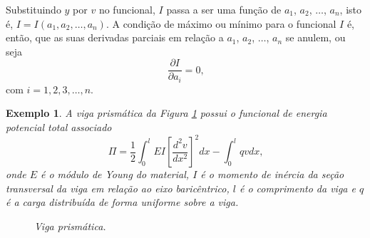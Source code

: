\documentclass[
	12pt,				%
	openright,			%
    twoside,			%
	a4paper,			%
	chapter=TITLE,		%
	english,			%
	french,				%
	spanish,			%
	brazil				%
	]{abntex2}
\newtheorem{exemplo}{Exemplo}
\numberwithin{lema}{chapter}
\numberwithin{teorema}{chapter}
\numberwithin{definicao}{chapter}
\numberwithin{exemplo}{chapter}
\numberwithin{figure}{chapter}
\begin{document}
Substituindo $y$ por $v$ no funcional, $I$ passa a ser uma função de $a_1$, $a_2$, $\dots$, $a_n$, isto é, $I=I(a_1, a_2, \dots, a_n)$. A condição de máximo ou mínimo para o funcional $I$ é, então, que as suas derivadas parciais em relação a $a_1$, $a_2$, $\dots$, $a_n$ se anulem, ou seja
$$
	\frac{\partial I}{\partial a_i} = 0
	\text{,}
$$
com $i=1, 2, 3, \dots, n$.

\begin{exemplo}
	\label{ex:mrr_ex_livro}\cite{mefassan}		
	A viga prismática da Figura \ref{fig:test_02} possui o funcional de energia potencial total associado
	\begin{equation}
		\label{eqn:cap_metodo_ray_ritz:exemplo_func_pi}
		\Pi = 
		\frac{1}{2} \int_0^l EI \left [
			\frac{d^2v}{dx^2}
		\right ]^2 dx
		-
		\int_0^l qvdx
		\text{,}
	\end{equation}
	onde $E$ é o módulo de Young do material, $I$ é o momento de inércia da seção transversal da viga em relação ao eixo baricêntrico, $l$ é o comprimento da viga e $q$ é a carga distribuída de forma uniforme sobre a viga.
	
	\begin{figure}[h]
		\caption{Viga prismática.}
		\centering
		\label{fig:test_02}	
	\end{figure}
	

\end{exemplo}
\end{document}
